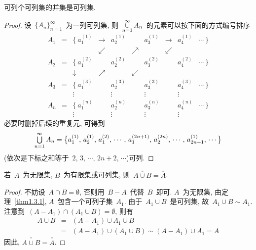 \begin{proposition} \label{thm1.3.6}
可列个可列集的并集是可列集.
\end{proposition}

\begin{proof}
设~$\{A_n\}_{n=1} ^\infty$~为一列可列集, 则~$\mathop{\cup} \limits_{n=1} ^\infty A_n$~的元素可以按下面的方式编号排序
\[
\begin{array}{cccccccccc}
A_1 &=& \{~a_1 ^{(1)} & \rightarrow & a_2 ^{(1)} && a_3 ^{(1)} & \rightarrow & a_4 ^{(1)} & \cdots~\} \\
    &&                &  \swarrow   &      & \nearrow &        &  \swarrow   &            &   \\
A_2 &=& \{~a_1 ^{(2)} &  & a_2 ^{(2)} && a_3 ^{(2)} &  & a_4 ^{(2)} & \cdots~\} \\
    &&   \downarrow   &  \nearrow   &      & \swarrow &        &  &  &   \\
A_3 &=& \{~a_1 ^{(3)} &  & a_2 ^{(3)} && a_3 ^{(3)} &  & a_4 ^{(3)} & \cdots~\} \\
    & &     \vdots    &  &   \vdots   &&    \vdots  &  &   \vdots   &           \\
A_n &=& \{~a_1 ^{(n)} &  & a_2 ^{(n)} && a_3 ^{(n)} &  & a_4 ^{(n)} & \cdots~\} \\
    & &     \vdots    &  &    \vdots  &&    \vdots  &  &   \vdots   &
\end{array}
\]
必要时删掉后续的重复元, 可得到
\[
\mathop{\textstyle{\bigcup}} \limits_{n=1} ^\infty A_n = \big\{a_1 ^{(1)}, \, a_2 ^{(1)}, \, a_1 ^{(2)}, \, \cdots, \, a_1 ^{(2n+1)}, \, a_2 ^{(2n)}, \, \cdots, \, a_{2n+1} ^{(1)}, \, \cdots\big\}
\]
(依次是下标之和等于~$2, \, 3, \, \cdots, \, 2n+2, \, \cdots$)可列.
\end{proof}

\begin{proposition} \label{thm1.3.7}
若~$A$~为无限集, $B$~为有限集或可列集, 则~$\overline{\overline{A \cup B}} = \overline{\overline{A}}$.
\end{proposition}

\begin{proof}
不妨设~$A \cap B = \emptyset$, 否则用~$B - A$~代替~$B$~即可. $A$~为无限集, 由定理~\ref{thm1.3.1}, $A$~包含一个可列子集~$A_1$. 由于~$A_1 \cup B$~是可列集, 故~$A_1 \cup B \sim A_1$. 注意到~$(A - A_1) \cap (A_1 \cup B) = \emptyset$, 则有
\begin{eqnarray*}
A \cup B &=& (A - A_1) \cup A_1 \cup B \\
&=& (A - A_1) \cup (A_1 \cup B) \sim (A - A_1) \cup A_1 = A
\end{eqnarray*}
因此, $\overline{\overline{A \cup B}} = \overline{\overline{A}}$.
\end{proof}

